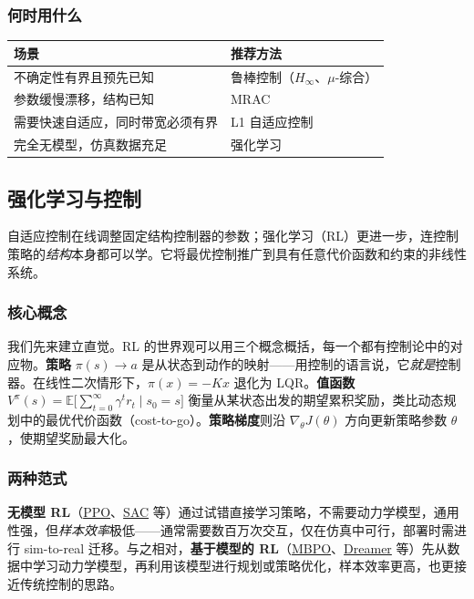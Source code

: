 \subsubsection{何时用什么}

\begin{center}
\small
\begin{tabular}{l l}
\toprule
\textbf{场景} & \textbf{推荐方法} \\
\midrule
不确定性有界且预先已知 & 鲁棒控制（$H_\infty$、$\mu$-综合） \\
参数缓慢漂移，结构已知 & MRAC \\
需要快速自适应，同时带宽必须有界 & L1 自适应控制 \\
完全无模型，仿真数据充足 & 强化学习 \\
\bottomrule
\end{tabular}
\end{center}

\subsection{强化学习与控制}

自适应控制在线调整固定结构控制器的参数；强化学习（RL）更进一步，连控制策略的\emph{结构}本身都可以学。它将最优控制推广到具有任意代价函数和约束的非线性系统。

\subsubsection{核心概念}

我们先来建立直觉。RL 的世界观可以用三个概念概括，每一个都有控制论中的对应物。\textbf{策略} $\pi(s) \to a$ 是从状态到动作的映射------用控制的语言说，它\emph{就是}控制器。在线性二次情形下，$\pi(x) = -Kx$ 退化为 LQR。\textbf{值函数} $V^\pi(s) = \mathbb{E}\bigl[\sum_{t=0}^{\infty} \gamma^t r_t \mid s_0 = s\bigr]$ 衡量从某状态出发的期望累积奖励，类比动态规划中的最优代价函数（cost-to-go）。\textbf{策略梯度}则沿 $\nabla_\theta J(\theta)$ 方向更新策略参数 $\theta$，使期望奖励最大化。

\subsubsection{两种范式}

\textbf{无模型 RL}（\href{https://arxiv.org/abs/1707.06347}{PPO}、\href{https://arxiv.org/abs/1801.01290}{SAC} 等）通过试错直接学习策略，不需要动力学模型，通用性强，但\emph{样本效率}极低------通常需要数百万次交互，仅在仿真中可行，部署时需进行 sim-to-real 迁移。与之相对，\textbf{基于模型的 RL}（\href{https://arxiv.org/abs/1906.08253}{MBPO}、\href{https://arxiv.org/abs/1912.01603}{Dreamer} 等）先从数据中学习动力学模型，再利用该模型进行规划或策略优化，样本效率更高，也更接近传统控制的思路。

